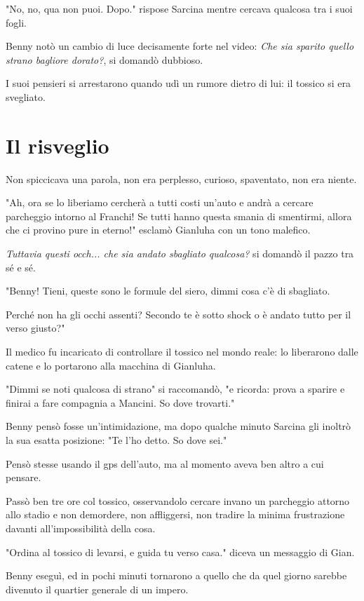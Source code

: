 "No, no, qua non puoi. Dopo." rispose Sarcina mentre cercava qualcosa tra i suoi fogli.

Benny notò un cambio di luce decisamente forte nel video: \textit{Che sia sparito quello strano bagliore dorato?}, si domandò dubbioso.

I suoi pensieri si arrestarono quando udì un rumore dietro di lui: il tossico si era svegliato.

\section{Il risveglio}

Non spiccicava una parola, non era perplesso, curioso, spaventato, non era niente.

"Ah, ora se lo liberiamo cercherà a tutti costi un'auto e andrà a cercare parcheggio intorno al Franchi! Se tutti hanno questa smania di smentirmi, allora che ci provino pure in eterno!" esclamò Gianluha con un tono malefico.

\textit{Tuttavia questi occh... che sia andato sbagliato qualcosa?} si domandò il pazzo tra sé e sé.

"Benny! Tieni, queste sono le formule del siero, dimmi cosa c'è di sbagliato.

Perché non ha gli occhi assenti? Secondo te è sotto shock o è andato tutto per il verso giusto?"

Il medico fu incaricato di controllare il tossico nel mondo reale: lo liberarono dalle catene e lo portarono alla macchina di Gianluha.

"Dimmi se noti qualcosa di strano" si raccomandò, "e ricorda: prova a sparire e finirai a fare compagnia a Mancini. So dove trovarti."

Benny pensò fosse un'intimidazione, ma dopo qualche minuto Sarcina gli inoltrò la sua esatta posizione: "Te l'ho detto. So dove sei."

Pensò stesse usando il gps dell'auto, ma al momento aveva ben altro a cui pensare.

Passò ben tre ore col tossico, osservandolo cercare invano un parcheggio attorno allo stadio e non demordere, non affliggersi, non tradire la minima frustrazione davanti all'impossibilità della cosa.

"Ordina al tossico di levarsi, e guida tu verso casa." diceva un messaggio di Gian.

Benny eseguì, ed in pochi minuti tornarono a quello che da quel giorno sarebbe divenuto il quartier generale di un impero.

